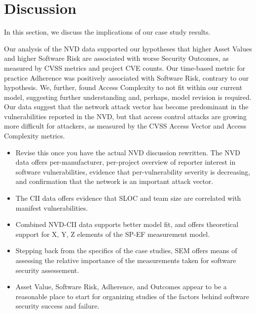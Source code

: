 \section{Discussion}
\label{sec:discussion}

In this section, we discuss the implications of our case study results.

Our analysis of the NVD data supported our hypotheses that higher Asset Values and higher Software Risk are associated with worse Security Outcomes, as measured by CVSS metrics and project CVE counts. Our time-based metric for practice Adherence was positively associated with Software Risk, contrary to our hypothesis. We, further, found Access Complexity to not fit within our current model, suggesting further understanding and, perhaps, model revision is required. Our data suggest that the network attack vector has become predominant in the vulnerabilities reported in the NVD, but that access control attacks are growing more difficult for attackers, as measured by the CVSS Access Vector and Access Complexity metrics. 

\begin{itemize}
	\item Revise this once you have the actual NVD discussion rewritten. The NVD data offers per-manufacturer, per-project overview of reporter interest in software vulnerabilities, evidence that per-vulnerability severity is decreasing, and confirmation that the network is an important attack vector.
	\item The CII data offers evidence that SLOC and team size are correlated with manifest vulnerabilities. 
	\item Combined NVD-CII data supports better model fit, and offers theoretical support for X, Y, Z elements of the SP-EF measurement model. 
	\item Stepping back from the specifics of the case studies, SEM offers means of assessing the relative importance of the measurements taken for software security assessement.
	\item Asset Value, Software Risk, Adherence, and Outcomes appear to be a reasonable place to start for organizing studies of the factors behind software security success and failure. 
\end{itemize}

